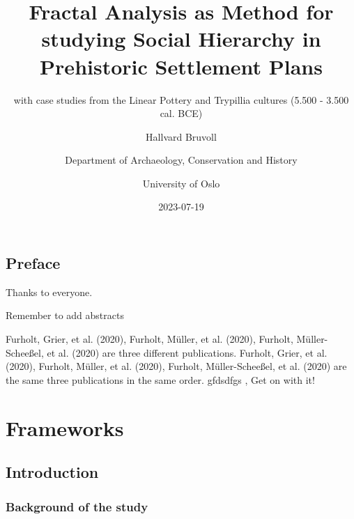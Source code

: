 \documentclass[
  12pt,
]{book}
\title{Fractal Analysis as Method for studying Social Hierarchy in Prehistoric Settlement Plans}
\subtitle{with case studies from the Linear Pottery and Trypillia cultures (5.500 - 3.500 cal. BCE)}
\author{Hallvard Bruvoll \and Department of Archaeology, Conservation and History \and University of Oslo}
\date{2023-07-19}
\begin{document}
\maketitle

{
\setcounter{tocdepth}{1}
\tableofcontents
}
\hypertarget{preface}{%
\chapter*{Preface}\label{preface}}

Thanks to everyone.

Remember to add abstracts

Furholt, Grier, et al. (2020), Furholt, Müller, et al. (2020), Furholt, Müller-Scheeßel, et al. (2020) are three different publications. Furholt, Grier, et al. (2020), Furholt, Müller, et al. (2020), Furholt, Müller-Scheeßel, et al. (2020) are the same three publications in the same order. gfdsdfgs , Get on with it!

\hypertarget{part-frameworks}{%
\part{Frameworks}\label{part-frameworks}}

\hypertarget{intro}{%
\chapter{Introduction}\label{intro}}

\hypertarget{background-of-the-study}{%
\section{Background of the study}\label{background-of-the-study}}
\end{document}
